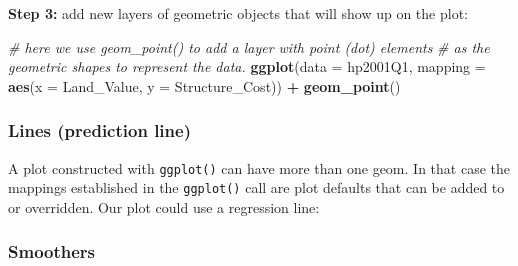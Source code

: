 \documentclass[]{book}
\newenvironment{Shaded}{\begin{snugshade}}{\end{snugshade}}
\newcommand{\KeywordTok}[1]{\textcolor[rgb]{0.13,0.29,0.53}{\textbf{#1}}}
\newcommand{\DataTypeTok}[1]{\textcolor[rgb]{0.13,0.29,0.53}{#1}}
\newcommand{\StringTok}[1]{\textcolor[rgb]{0.31,0.60,0.02}{#1}}
\newcommand{\CommentTok}[1]{\textcolor[rgb]{0.56,0.35,0.01}{\textit{#1}}}
\newcommand{\OperatorTok}[1]{\textcolor[rgb]{0.81,0.36,0.00}{\textbf{#1}}}
\newcommand{\NormalTok}[1]{#1}
\begin{document}
\textbf{Step 3:} add new layers of geometric objects that will show up
on the plot:

\begin{Shaded}
\begin{Highlighting}[]
\CommentTok{# here we use geom_point() to add a layer with point (dot) elements }
\CommentTok{# as the geometric shapes to represent the data.}
\KeywordTok{ggplot}\NormalTok{(}\DataTypeTok{data =}\NormalTok{ hp2001Q1, }\DataTypeTok{mapping =} \KeywordTok{aes}\NormalTok{(}\DataTypeTok{x =}\NormalTok{ Land_Value, }\DataTypeTok{y =}\NormalTok{ Structure_Cost)) }\OperatorTok{+}
\StringTok{  }\KeywordTok{geom_point}\NormalTok{()}
\end{Highlighting}
\end{Shaded}

\subsubsection{Lines (prediction line)}\label{lines-prediction-line}

A plot constructed with \texttt{ggplot()} can have more than one geom.
In that case the mappings established in the \texttt{ggplot()} call are
plot defaults that can be added to or overridden. Our plot could use a
regression line:

\begin{Shaded}
\end{Shaded}

\subsubsection{Smoothers}\label{smoothers}
\end{document}
